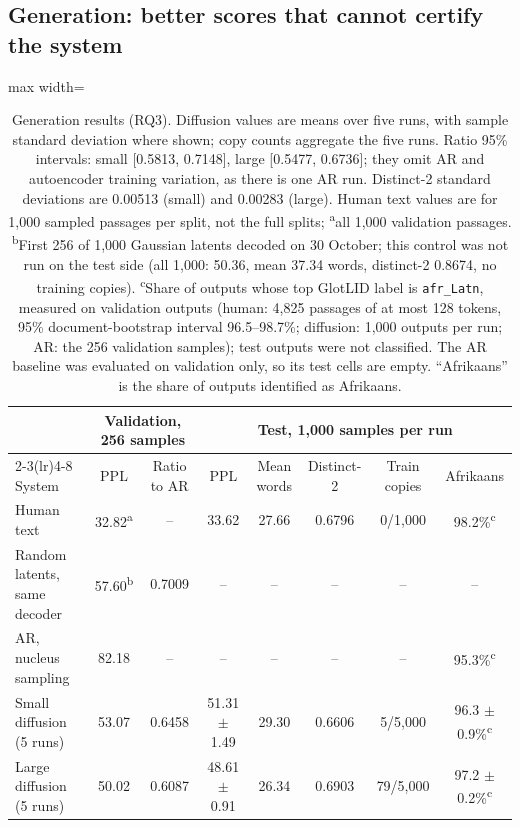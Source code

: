 \documentclass[11pt,a4paper]{article}
\begin{document}
\subsection{Generation: better scores that cannot certify the system}
\label{sec:res-gen}

\begin{table}[t]
\centering
\small
\setlength{\tabcolsep}{4pt}
\begin{adjustbox}{max width=\textwidth}
\begin{tabular}{lccccccc}
\toprule
& \multicolumn{2}{c}{Validation, 256 samples} & \multicolumn{5}{c}{Test, 1,000 samples per run} \\
\cmidrule(lr){2-3}\cmidrule(lr){4-8}
System & PPL & Ratio to AR & PPL & Mean words & Distinct-2 & Train copies & Afrikaans \\
\midrule
Human text & 32.82\textsuperscript{a} & -- & 33.62 & 27.66 & 0.6796 & 0/1,000 & 98.2\%\textsuperscript{c} \\
Random latents, same decoder & 57.60\textsuperscript{b} & 0.7009 & -- & -- & -- & -- & -- \\
AR, nucleus sampling & 82.18 & -- & -- & -- & -- & -- & 95.3\%\textsuperscript{c} \\
Small diffusion (5 runs) & 53.07 & 0.6458 & 51.31 $\pm$ 1.49 & 29.30 & 0.6606 & 5/5,000 & 96.3 $\pm$ 0.9\%\textsuperscript{c} \\
Large diffusion (5 runs) & 50.02 & 0.6087 & 48.61 $\pm$ 0.91 & 26.34 & 0.6903 & 79/5,000 & 97.2 $\pm$ 0.2\%\textsuperscript{c} \\
\bottomrule
\end{tabular}
\end{adjustbox}
\caption{Generation results (RQ3). Diffusion values are means over five runs, with sample standard deviation where shown; copy counts aggregate the five runs. Ratio 95\% intervals: small [0.5813, 0.7148], large [0.5477, 0.6736]; they omit AR and autoencoder training variation, as there is one AR run. Distinct-2 standard deviations are 0.00513 (small) and 0.00283 (large). Human text values are for 1,000 sampled passages per split, not the full splits; \textsuperscript{a}all 1,000 validation passages. \textsuperscript{b}First 256 of 1,000 Gaussian latents decoded on 30 October; this control was not run on the test side (all 1,000: 50.36, mean 37.34 words, distinct-2 0.8674, no training copies). \textsuperscript{c}Share of outputs whose top GlotLID label is \texttt{afr\_Latn}, measured on validation outputs (human: 4,825 passages of at most 128 tokens, 95\% document-bootstrap interval 96.5--98.7\%; diffusion: 1,000 outputs per run; AR: the 256 validation samples); test outputs were not classified. The AR baseline was evaluated on validation only, so its test cells are empty. ``Afrikaans'' is the share of outputs identified as Afrikaans.}
\label{tab:generation}
\end{table}
\end{document}
